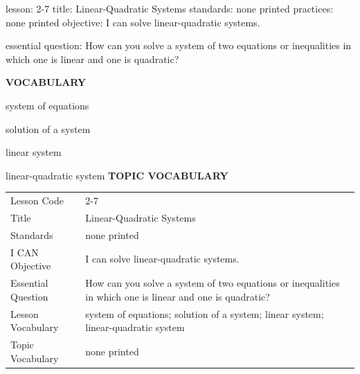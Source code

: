 \documentclass{article}
\newenvironment{lesson-meta}{}{}        %
\newcommand{\te}[1]{}                   %
\begin{document}
\begin{lesson-meta}
lesson: 2-7
title: Linear-Quadratic Systems
standards: none printed
practices: none printed
objective: I can solve linear-quadratic systems.

essential question: How can you solve a system of two equations or inequalities in which one is linear and one is quadratic?

\textbf{VOCABULARY}
\item system of equations
\item solution of a system
\item linear system
\item linear-quadratic system
\textbf{TOPIC VOCABULARY}
\te{No separate topic vocabulary list is printed on these lesson pages.}
\begin{tabular}{ll}
Lesson Code & 2-7 \\
Title & Linear-Quadratic Systems \\
Standards & none printed \\
I CAN Objective & I can solve linear-quadratic systems. \\
Essential Question & How can you solve a system of two equations or inequalities in which one is linear and one is quadratic? \\
Lesson Vocabulary & system of equations; solution of a system; linear system; linear-quadratic system \\
Topic Vocabulary & none printed \\
\end{tabular}
\end{lesson-meta}
\end{document}
